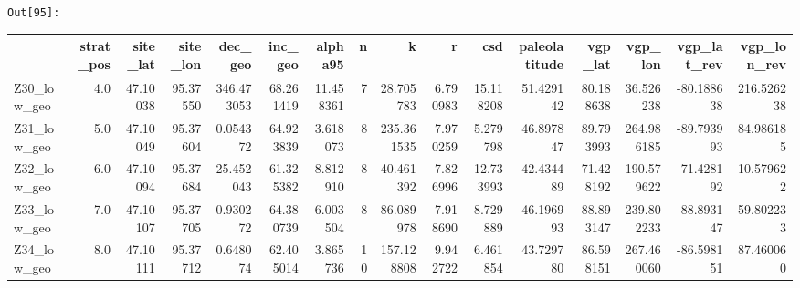 \documentclass[11pt]{article}
\begin{document}
\texttt{\color{outcolor}Out[{\color{outcolor}95}]:}
\begin{sidewaystable}    
    {\tiny\begin{tabular}{lrrrrrrrrrrrrrrr}
\toprule
{} &  strat\_pos &  site\_lat &  site\_lon &     dec\_geo &    inc\_geo &    alpha95 &   n &           k &         r &        csd &  paleolatitude &    vgp\_lat &     vgp\_lon &  vgp\_lat\_rev &  vgp\_lon\_rev \\
\midrule
Z30\_low\_geo &        4.0 &  47.10038 &  95.37550 &  346.473053 &  68.261419 &  11.458361 &   7 &   28.705783 &  6.790983 &  15.118208 &      51.429142 &  80.188638 &   36.526238 &   -80.188638 &   216.526238 \\
Z31\_low\_geo &        5.0 &  47.10049 &  95.37604 &    0.054372 &  64.923839 &   3.618073 &   8 &  235.361535 &  7.970259 &   5.279798 &      46.897847 &  89.793993 &  264.986185 &   -89.793993 &    84.986185 \\
Z32\_low\_geo &        6.0 &  47.10094 &  95.37684 &   25.452043 &  61.325382 &   8.812910 &   8 &   40.461392 &  7.826996 &  12.733993 &      42.434489 &  71.428192 &  190.579622 &   -71.428192 &    10.579622 \\
Z33\_low\_geo &        7.0 &  47.10107 &  95.37705 &    0.930272 &  64.380739 &   6.003504 &   8 &   86.089978 &  7.918690 &   8.729889 &      46.196993 &  88.893147 &  239.802233 &   -88.893147 &    59.802233 \\
Z34\_low\_geo &        8.0 &  47.10111 &  95.37712 &    0.648074 &  62.405014 &   3.865736 &  10 &  157.128808 &  9.942722 &   6.461854 &      43.729780 &  86.598151 &  267.460060 &   -86.598151 &    87.460060 \\
\bottomrule
\end{tabular}}
\end{sidewaystable}
    
\end{document}
